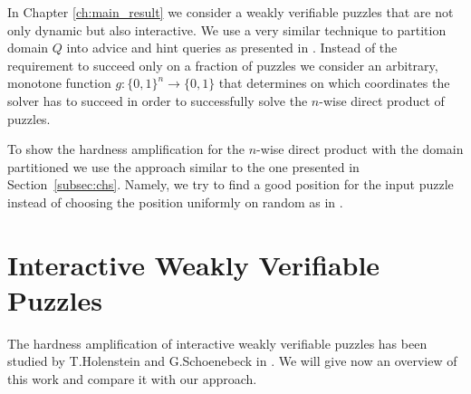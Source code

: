 In Chapter \ref{ch:main_result} we consider a weakly verifiable puzzles that are not only dynamic but also interactive.
We use a very similar technique to partition domain $Q$ into advice and hint queries as presented in \cite{Dodis:2009:SAI:1530441.1530450}.
Instead of the requirement to succeed only on a fraction of puzzles we consider an arbitrary, monotone function $g : \{0,1\}^{n} \rightarrow \{0,1\}$
that determines on which coordinates the solver has to succeed in order to successfully solve the $n$-wise direct product of puzzles.

To show the hardness amplification for the $n$-wise direct product with the domain partitioned we use
the approach similar to the one presented in Section~\ref{subsec:chs}. Namely, we try to find a good position for the input puzzle instead of
choosing the position uniformly on random as in \cite{Dodis:2009:SAI:1530441.1530450}.

\section{Interactive Weakly Verifiable Puzzles}
%
The hardness amplification of interactive weakly verifiable puzzles has been studied by T.Holenstein and G.Schoenebeck in \cite{DBLP:journals/corr/abs-1002-3534}.
We will give now an overview of this work and compare it with our approach.

